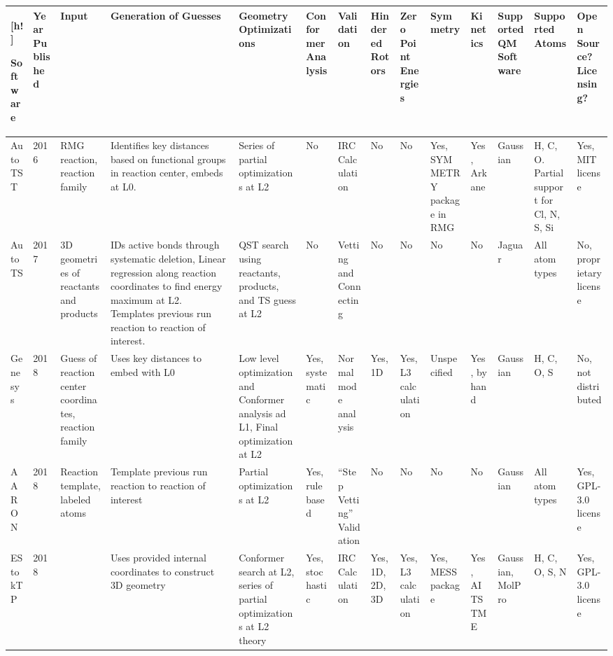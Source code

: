 \documentclass[preprint, 11pt]{elsarticle} %
\begin{document}
\begin{center}
\begin{singlespace}
\begin{adjustbox}{angle=90}
\begin{scriptsize}
\begin{tabular}{m{0.45in}||m{0.25in} | m{0.45in} | m{0.8in} | m{0.7in}| m{0.5in}| m{0.5in }|m{0.45in}| m{0.45in}| m{0.5in}| m{0.45in}| m{0.5in}| m{0.5in} | m{0.45in}}[h!]
    
    Software & Year Published & Input & Generation of Guesses & Geometry Optimizations & Conformer Analysis & Validation & Hindered Rotors & Zero Point Energies & Symmetry & Kinetics & Supported QM Software & Supported Atoms & Open Source? Licensing? \\
    \hline
    \hline
    AutoTST & 2016 & RMG reaction, reaction family & Identifies key distances based on functional groups in reaction center, embeds at L0. & Series of partial optimizations at L2 & No & IRC Calculation & No & No & Yes, SYMMETRY package in RMG & Yes, Arkane & Gaussian & H, C, O. Partial support for Cl, N, S, Si & Yes, MIT license \\
    \hline
    AutoTS  & 2017 & 3D geometries of reactants and products & IDs active bonds through systematic deletion, Linear regression along reaction coordinates to find energy maximum at L2. Templates previous run reaction to reaction of interest. & QST search using reactants, products, and TS guess at L2 & No & Vetting and Connecting & No & No & No & No & Jaguar & All atom types & No, proprietary license \\
    \hline 
    Genesys & 2018 & Guess of reaction center coordinates, reaction family & Uses key distances to embed with L0 & Low level optimization and Conformer analysis ad L1, Final optimization at L2 & Yes, systematic & Normal mode analysis & Yes, 1D & Yes, L3 calculation & Unspecified & Yes, by hand & Gaussian& H, C, O, S & No, not distributed \\ 
    \hline
    AARON   & 2018 & Reaction template, labeled atoms & Template previous run reaction to reaction of interest & Partial optimizations at L2 & Yes, rule based & ``Step Vetting'' Validation & No & No & No & No & Gaussian & All atom types & Yes, GPL-3.0 license \\ 
    \hline
    EStokTP & 2018 & & Uses provided internal coordinates to construct 3D geometry & Conformer search at L2, series of partial optimizations at L2 theory & Yes, stochastic & IRC Calculation &Yes, 1D, 2D, 3D & Yes, L3 calculation & Yes, MESS package & Yes, AITSTME & Gaussian, MolPro & H, C, O, S, N & Yes, GPL-3.0 license  \\ 

\end{tabular}
\end{scriptsize}
\end{adjustbox}
\end{singlespace}
\end{center}
\end{document}
